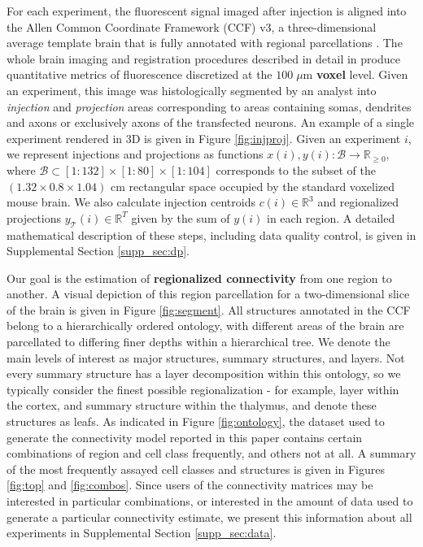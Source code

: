 For each experiment, the fluorescent signal imaged after injection is aligned into the Allen Common Coordinate Framework (CCF) v3, a three-dimensional average template brain that is fully annotated with regional parcellations \cite{Wang2020-po}.
The whole brain imaging and registration procedures described in detail in \citet{Oh2014-kh, Kuan2015-zz} produce quantitative metrics of fluorescence discretized at the $100 \; \mu$m \textbf{voxel} level. 
Given an experiment, this image was histologically segmented by an analyst into \textit{injection} and \textit{projection} areas corresponding to areas containing somas, dendrites and axons or exclusively axons of the transfected neurons.
An example of a single experiment rendered in 3D is given in Figure \ref{fig:injproj}.
Given an experiment $i$, we represent injections and projections as functions $x(i),y(i) : \mathcal B \to \mathbb R_{\geq 0}$, where $\mathcal B \subset [1:132] \times [1:80] \times [1:104]$ corresponds to the subset of the $(1.32 \times 0.8 \times 1.04)$ cm rectangular space occupied by the standard voxelized mouse brain.
We also calculate injection centroids $c(i) \in \mathbb R^3$ and regionalized projections $y_{\mathcal T} (i) \in \mathbb R^{T} $ given by the sum of $y(i)$ in each region.
A detailed mathematical description of these steps, including data quality control, is given in Supplemental Section \ref{supp_sec:dp}.

Our goal is the estimation of \textbf{regionalized connectivity} from one region to another.
A visual depiction of this region parcellation for a two-dimensional slice of the brain is given in Figure \ref{fig:segment}.
All structures annotated in the CCF belong to a hierarchically ordered ontology, with different areas of the brain are parcellated to differing finer depths within a hierarchical tree.
We denote the main levels of interest as major structures, summary structures, and layers.
Not every summary structure has a layer decomposition within this ontology, so we typically consider the finest possible regionalization - for example, layer within the cortex, and summary structure within the thalymus, and denote these structures as leafs.
As indicated in Figure \ref{fig:ontology}, the dataset used to generate the connectivity model reported in this paper contains certain combinations of region and cell class frequently, and others not at all.
A summary of the most frequently assayed cell classes and structures is given in Figures \ref{fig:top} and \ref{fig:combos}.
Since users of the connectivity matrices may be interested in particular combinations, or interested in the amount of data used to generate a particular connectivity estimate, we present this information about all experiments in Supplemental Section \ref*{supp_sec:data}.

